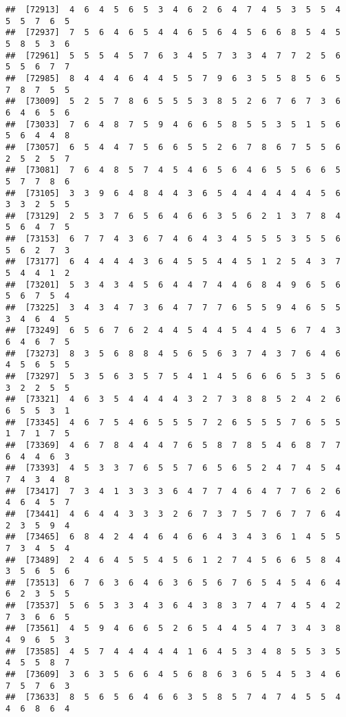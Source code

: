 \documentclass[
]{book}
\begin{document}
\begin{verbatim}
##  [72913]  4  6  4  5  6  5  3  4  6  2  6  4  7  4  5  3  5  5  4  5  5  7  6  5
##  [72937]  7  5  6  4  6  5  4  4  6  5  6  4  5  6  6  8  5  4  5  5  8  5  3  6
##  [72961]  5  5  5  4  5  7  6  3  4  5  7  3  3  4  7  7  2  5  6  5  5  6  7  7
##  [72985]  8  4  4  4  6  4  4  5  5  7  9  6  3  5  5  8  5  6  5  7  8  7  5  5
##  [73009]  5  2  5  7  8  6  5  5  5  3  8  5  2  6  7  6  7  3  6  6  4  6  5  6
##  [73033]  7  6  4  8  7  5  9  4  6  6  5  8  5  5  3  5  1  5  6  5  6  4  4  8
##  [73057]  6  5  4  4  7  5  6  6  5  5  2  6  7  8  6  7  5  5  6  2  5  2  5  7
##  [73081]  7  6  4  8  5  7  4  5  4  6  5  6  4  6  5  5  6  6  5  5  7  7  8  6
##  [73105]  3  3  9  6  4  8  4  4  3  6  5  4  4  4  4  4  4  5  6  3  3  2  5  5
##  [73129]  2  5  3  7  6  5  6  4  6  6  3  5  6  2  1  3  7  8  4  5  6  4  7  5
##  [73153]  6  7  7  4  3  6  7  4  6  4  3  4  5  5  5  3  5  5  6  5  6  2  7  3
##  [73177]  6  4  4  4  4  3  6  4  5  5  4  4  5  1  2  5  4  3  7  5  4  4  1  2
##  [73201]  5  3  4  3  4  5  6  4  4  7  4  4  6  8  4  9  6  5  6  5  6  7  5  4
##  [73225]  3  4  3  4  7  3  6  4  7  7  7  6  5  5  9  4  6  5  5  3  4  6  4  5
##  [73249]  6  5  6  7  6  2  4  4  5  4  4  5  4  4  5  6  7  4  3  6  4  6  7  5
##  [73273]  8  3  5  6  8  8  4  5  6  5  6  3  7  4  3  7  6  4  6  4  5  6  5  5
##  [73297]  5  3  5  6  3  5  7  5  4  1  4  5  6  6  6  5  3  5  6  3  2  2  5  5
##  [73321]  4  6  3  5  4  4  4  4  3  2  7  3  8  8  5  2  4  2  6  6  5  5  3  1
##  [73345]  4  6  7  5  4  6  5  5  5  7  2  6  5  5  5  7  6  5  5  1  7  1  7  5
##  [73369]  4  6  7  8  4  4  4  7  6  5  8  7  8  5  4  6  8  7  7  6  4  4  6  3
##  [73393]  4  5  3  3  7  6  5  5  7  6  5  6  5  2  4  7  4  5  4  7  4  3  4  8
##  [73417]  7  3  4  1  3  3  3  6  4  7  7  4  6  4  7  7  6  2  6  4  6  4  5  7
##  [73441]  4  6  4  4  3  3  3  2  6  7  3  7  5  7  6  7  7  6  4  2  3  5  9  4
##  [73465]  6  8  4  2  4  4  6  4  6  6  4  3  4  3  6  1  4  5  5  7  3  4  5  4
##  [73489]  2  4  6  4  5  5  4  5  6  1  2  7  4  5  6  6  5  8  4  3  5  6  5  6
##  [73513]  6  7  6  3  6  4  6  3  6  5  6  7  6  5  4  5  4  6  4  6  2  3  5  5
##  [73537]  5  6  5  3  3  4  3  6  4  3  8  3  7  4  7  4  5  4  2  7  3  6  6  5
##  [73561]  4  5  9  4  6  6  5  2  6  5  4  4  5  4  7  3  4  3  8  4  9  6  5  3
##  [73585]  4  5  7  4  4  4  4  4  1  6  4  5  3  4  8  5  5  3  5  4  5  5  8  7
##  [73609]  3  6  3  5  6  6  4  5  6  8  6  3  6  5  4  5  3  4  6  7  5  7  6  3
##  [73633]  8  5  6  5  6  4  6  6  3  5  8  5  7  4  7  4  5  5  4  4  6  8  6  4

\end{verbatim}
\end{document}
